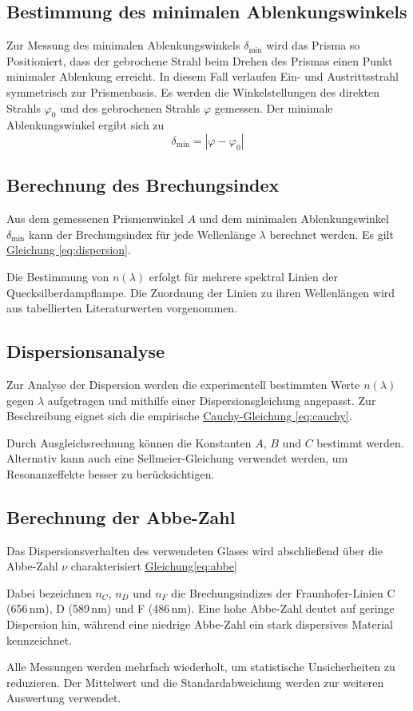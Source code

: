 \subsection{Bestimmung des minimalen Ablenkungswinkels}
Zur Messung des minimalen Ablenkungswinkels \(\delta_{\text{min}}\) wird das Prisma so Positioniert, dass der gebrochene Strahl beim Drehen des Prismas einen Punkt minimaler Ablenkung erreicht. In diesem Fall verlaufen Ein- und Austrittsstrahl symmetrisch zur Prismenbasis. Es werden die Winkelstellungen des direkten Strahls \(\varphi_0\) und des gebrochenen Strahls \(\varphi\) gemessen. Der minimale Ablenkungswinkel ergibt sich zu
\begin{equation}
\delta_{\text{min}} = \left| \varphi - \varphi_0 \right|
\label{eq:ablwinkel}
\end{equation}

\subsection{Berechnung des Brechungsindex}
Aus dem gemessenen Prismenwinkel \(A\) und dem minimalen Ablenkungswinkel \(\delta_{\text{min}}\) kann der Brechungsindex für jede Wellenlänge \(\lambda\) berechnet werden. Es gilt \hyperref[eq:dispersion]{Gleichung \ref*{eq:dispersion}}.

Die Bestimmung von \(n(\lambda)\) erfolgt für mehrere spektral Linien der Quecksilberdampflampe. Die Zuordnung der Linien zu ihren Wellenlängen wird aus tabellierten Literaturwerten vorgenommen.

\subsection{Dispersionsanalyse}
Zur Analyse der Dispersion werden die experimentell bestimmten Werte \(n(\lambda)\) gegen \(\lambda\) aufgetragen und mithilfe einer Dispersionsgleichung angepasst. Zur Beschreibung eignet sich die empirische \hyperref[eq:cauchy]{Cauchy-Gleichung \ref*{eq:cauchy}}.

Durch Ausgleichsrechnung können die Konstanten \(A\), \(B\) und \(C\) bestimmt werden. Alternativ kann auch eine Sellmeier-Gleichung verwendet werden, um Resonanzeffekte besser zu berücksichtigen.

\subsection{Berechnung der Abbe-Zahl}
Das Dispersionsverhalten des verwendeten Glases wird abschließend über die Abbe-Zahl \(\nu\) charakterisiert \hyperref[eq:abbe]{Gleichung\ref*{eq:abbe}}

Dabei bezeichnen \(n_C\), \(n_D\) und \(n_F\) die Brechungsindizes der Fraunhofer-Linien C (656\,nm), D (589\,nm) und F (486\,nm). Eine hohe Abbe-Zahl deutet auf geringe Dispersion hin, während eine niedrige Abbe-Zahl ein stark dispersives Material kennzeichnet.

Alle Messungen werden mehrfach wiederholt, um statistische Unsicherheiten zu reduzieren. Der Mittelwert und die Standardabweichung werden zur weiteren Auswertung verwendet.
